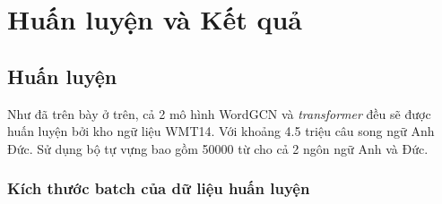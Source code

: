 \chapter{Huấn luyện và Kết quả}

\section{Huấn luyện}

Như đã trên bày ở trên, cả 2 mô hình WordGCN và  \textit{transformer}  đều sẽ được huấn luyện bởi kho ngữ liệu WMT14. Với khoảng 4.5 triệu câu song ngữ Anh Đức. Sử dụng bộ tự vựng bao gồm 50000 từ cho cả 2 ngôn ngữ Anh và Đức.

\subsection{Kích thước batch của dữ liệu huấn luyện}

